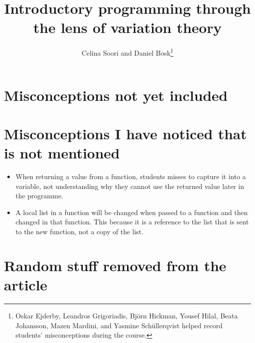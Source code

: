 \documentclass[a4paper,10pt,article,oneside,oldfontcommands]{memoir}
\title{%
  Introductory programming through the lens of variation theory%
}
\author{%
  Celina Soori and
  Daniel Bosk\thanks{%
    Oskar Ejderby,
    Leandros Grigoriadis,
    Björn Hickman,
    Yousef Hilal,
    Beata Johansson,
    Mazen Mardini, and
    Yasmine Schüllerqvist
    helped record students' misconceptions during the course.
  }%
}
\let\section\chapter
\begin{document}

\maketitle
\begin{abstract}
  
\end{abstract}

\clearpage
\tableofcontents
\clearpage


















\printbibliography

\appendix

\section{Misconceptions not yet included}




\section{Misconceptions I have noticed that is not mentioned}

\begin{itemize}
    \item When returning a value from a function, students misses to 
capture it into a variable, not understanding why they cannot use the 
returned value later in the programme. 
    \item A local list in a function will be changed when passed to a 
function and then changed in that function. This because it is a 
reference to the list that is sent to the new function, not a copy of 
the list. 
\end{itemize}

\section{Random stuff removed from the article}
\end{document}
